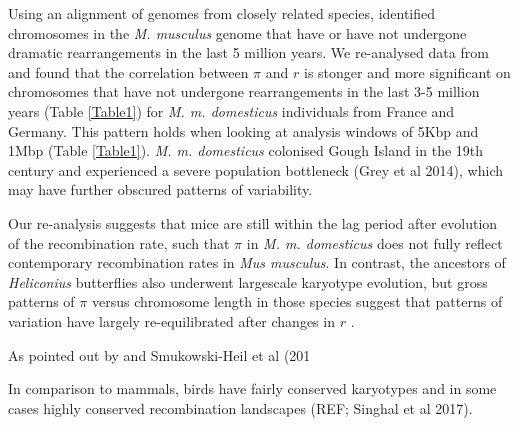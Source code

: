 \documentclass[11pt,twoside, onecolumn]{GSA_format}
\begin{document}
\vspace{5px}

Using an alignment of genomes from closely related species, \cite{Thybert2018} identified chromosomes in the \textit{M. musculus} genome that have or have not undergone dramatic rearrangements in the last 5 million years. We re-analysed data from \cite{Kartje2020} and found that the correlation between $\pi$ and $r$ is stonger and more significant on chromosomes that have not undergone rearrangements in the last 3-5 million years (Table \ref{Table1}) for \textit{M. m. domesticus} individuals from France and Germany. This pattern holds when looking at analysis windows of 5Kbp and 1Mbp (Table \ref{Table1}). \textit{M. m. domesticus} colonised Gough Island in the 19th century and experienced a severe population bottleneck (Grey et al 2014), which may have further obscured patterns of variability. 

Our re-analysis suggests that mice are still within the lag period after evolution of the recombination rate, such that $\pi$ in \textit{M. m. domesticus} does not fully reflect contemporary recombination rates in \textit{Mus musculus}. In contrast, the ancestors of \textit{Heliconius} butterflies also underwent largescale karyotype evolution, but gross patterns of $\pi$ versus chromosome length in those species suggest that patterns of variation have largely re-equilibrated after changes in $r$ \citep{Cicconardi2021}.






\vspace{5px}




\vspace{5px}





As pointed out by \citep{Comeron2017-jc} and Smukowski-Heil et al (201


In comparison to mammals, birds have fairly conserved karyotypes and in some cases highly conserved recombination landscapes (REF; Singhal et al 2017). 



\end{document}
